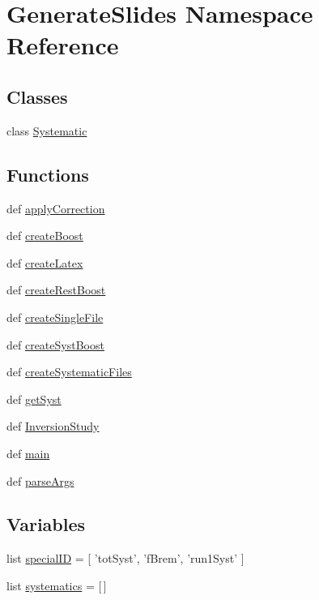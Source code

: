\hypertarget{namespaceGenerateSlides}{\section{Generate\+Slides Namespace Reference}
\label{namespaceGenerateSlides}
}
\subsection*{Classes}
\begin{DoxyCompactItemize}
\item 
class \hyperlink{classGenerateSlides_1_1Systematic}{Systematic}
\end{DoxyCompactItemize}
\subsection*{Functions}
\begin{DoxyCompactItemize}
\item 
def \hyperlink{namespaceGenerateSlides_af1ff6052d05578a26b78c27e82302d06}{apply\+Correction}
\item 
def \hyperlink{namespaceGenerateSlides_a4f1eb4669e0beec0bce130cc32afd10c}{create\+Boost}
\item 
def \hyperlink{namespaceGenerateSlides_ace4092f69cfabc0cc8df6a1a52916b88}{create\+Latex}
\item 
def \hyperlink{namespaceGenerateSlides_a0fc1f8eeb311f74b6802f04135572db4}{create\+Rest\+Boost}
\item 
def \hyperlink{namespaceGenerateSlides_ad0ebc582659bdb0fd1a01f7b1724768f}{create\+Single\+File}
\item 
def \hyperlink{namespaceGenerateSlides_a978768f0d074849472715f36528951ae}{create\+Syst\+Boost}
\item 
def \hyperlink{namespaceGenerateSlides_a3fa5a5d95445d3edb7fbccf58d038c3c}{create\+Systematic\+Files}
\item 
def \hyperlink{namespaceGenerateSlides_a9caf35cbdf336961a6c30fb57f8bd367}{get\+Syst}
\item 
def \hyperlink{namespaceGenerateSlides_a2941eb86cae1bd51b5c05fb56a3c6050}{Inversion\+Study}
\item 
def \hyperlink{namespaceGenerateSlides_a44bcf2f50f59e7b9badc99ed237a306b}{main}
\item 
def \hyperlink{namespaceGenerateSlides_a7dbfff9104a35a77b2b0ea54879e2b9b}{parse\+Args}
\end{DoxyCompactItemize}
\subsection*{Variables}
\begin{DoxyCompactItemize}
\item 
list \hyperlink{namespaceGenerateSlides_a3cdc26be6868cbe352c1a2b2e466088d}{special\+I\+D} = \mbox{[} 'tot\+Syst', 'f\+Brem', 'run1\+Syst' \mbox{]}
\item 
list \hyperlink{namespaceGenerateSlides_a1471b54956bf023b1b496ccda606a43f}{systematics} = \mbox{[}$\,$\mbox{]}
\end{DoxyCompactItemize}


